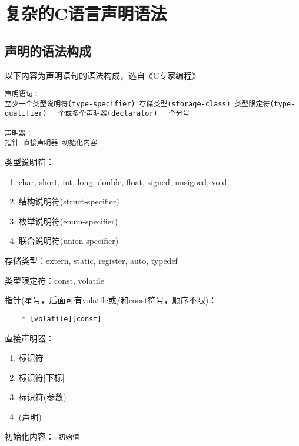 \section{复杂的C语言声明语法}

\subsection{声明的语法构成}
以下内容为声明语句的语法构成，选自《C专家编程》
\begin{lstlisting}
声明语句：
至少一个类型说明符(type-specifier) 存储类型(storage-class) 类型限定符(type-qualifier) 一个或多个声明器(declarator) 一个分号

声明器：
指针 直接声明器 初始化内容
\end{lstlisting}

类型说明符：
\begin{enumerate}
    \item char, short, int, long, double, float, signed, unsigned, void 
    \item 结构说明符(struct-specifier)
    \item 枚举说明符(enum-specifier)
    \item 联合说明符(union-specifier)
\end{enumerate}

存储类型：extern, static, register, auto, typedef

类型限定符：const, volatile

指针(星号，后面可有volatile或/和const符号，顺序不限)：
\begin{lstlisting}
    * [volatile][const]
\end{lstlisting}

直接声明器：
\begin{enumerate}
    \item 标识符
    \item 标识符[下标]
    \item 标识符(参数)
    \item (声明)
\end{enumerate}

初始化内容：\verb|=初始值|

